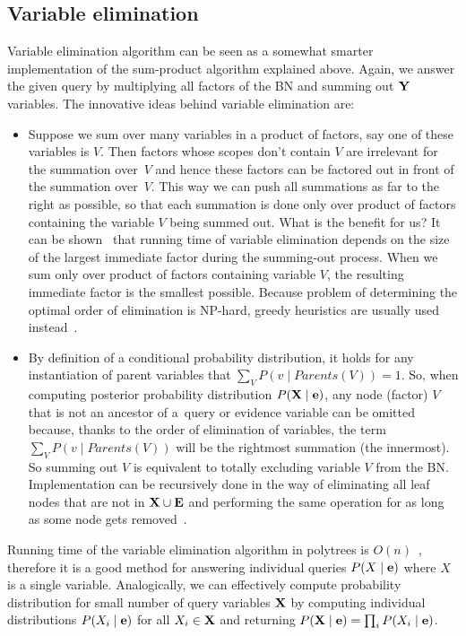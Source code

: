 \documentclass[english,cover]{fitthesis} %
\newcommand{\vars}[1]{{\bold{#1}}}         %
\newcommand{\todo}[1]{{\color{red}#1}}
\begin{document}
\subsection{Variable elimination}
Variable elimination algorithm can be seen as a somewhat smarter implementation of the sum-product algorithm explained above. Again, we answer the given query by multiplying all factors of the BN and summing out $\vars{Y}$ variables. The innovative ideas behind variable elimination are:
\begin{itemize}
	\item Suppose we sum over many variables in a product of factors, say one of these variables is $V$. Then factors whose scopes don't contain $V$ are irrelevant for the summation over~$V$ and hence these factors can be factored out in front of the summation over~$V$. This way we can push all summations as far to the right as possible, so that each summation is done only over product of factors containing the variable $V$ being summed out. What is the benefit for us? It can be shown~\cite{pgm} that running time of variable elimination depends on the size of the largest immediate factor during the summing-out process. When we sum only over product of factors containing variable $V$, the resulting immediate factor is the smallest possible. Because problem of determining the optimal order of elimination is NP-hard, greedy heuristics are usually used instead~\cite{pgm}.
	\item By definition of a conditional probability distribution, it holds for any instantiation of parent variables that $\sum_V P(v \mid Parents(V)) = 1$. So, when computing posterior probability distribution $P(\vars{X} \mid \vars{e})$, any node (factor) $V$ that is not an ancestor of a~query or evidence variable can be omitted because, thanks to the order of elimination of variables, the term $\sum_V P(v \mid Parents(V))$ will be the rightmost summation (the innermost). So summing out $V$ is equivalent to totally excluding variable $V$ from the BN. Implementation can be recursively done in the way of eliminating all leaf nodes that are not in $\vars{X} \cup \vars{E}$ and performing the same operation for as long as some node gets removed~\cite[p.~510]{russell_norvig_ed2}.
\end{itemize}


Running time of the variable elimination algorithm in polytrees is $O(n)$~\cite[p.~510]{russell_norvig_ed2}, therefore it is a good method for answering individual queries $P(X \mid \vars{e})$ where $X$ is a single variable. Analogically, we can effectively compute probability distribution for small number of query variables $\vars{X}$ by computing individual distributions $P(X_i \mid \vars{e})$ for all $X_i \in \vars{X}$ and returning $P(\vars{X} \mid \vars{e}) = \prod_i P(X_i \mid \vars{e})$.
\end{document}
